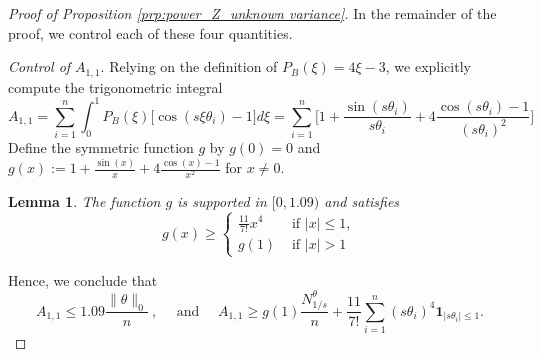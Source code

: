 \documentclass[twoside,11pt]{article}
\newtheorem{lem}{Lemma}
\def\beq{\begin{equation}}
\def\eeq{\end{equation}}
\newcommand{\<}{\langle}
\renewcommand{\>}{\rangle}
\begin{document}
\begin{proof}[Proof of Proposition \ref{prp:power_Z_unknown variance}]
 In the remainder of the proof, we control each of these four quantities. 
 
 \medskip 
 
 
 \noindent
 {\it Control of $A_{1,1}$}. Relying on the definition of $P_B(\xi)=4\xi-3$, we explicitly compute the trigonometric integral 
\[
A_{1,1} = \sum_{i=1}^n \int_{0}^1 P_B(\xi)\big[ \cos(s\xi\theta_i)-1 \big]d\xi= \sum_{i=1}^n  \Big[1 +  \frac{\sin(s \theta_i)}{s \theta_i}+ 4\frac{\cos(s \theta_i)-1}{(s\theta_i)^2} \Big]\]
Define the symmetric function $g$ by $g(0)=0$ and $g(x):= 1+ \frac{\sin(x)}{x}+ 4\frac{\cos(x)-1}{x^2}$ for $x\neq 0$.
\begin{lem}\label{lem:function_f}
The function $g$ is supported in $[0,1.09)$ and satisfies
\beq\label{eq:function_f_bound}
g(x) \geq \left\{
\begin{array}{cc}
 \frac{11}{7!} x^4 & \text{ if } |x|\leq 1,\\
 g(1) & \text{ if } |x|>1
\end{array}
\right.
\eeq 
\end{lem}
Hence, we conclude that 
\beq
A_{1,1}\leq1.09 \frac{\|\theta\|_0}{n} \ , \quad \text{ and }\quad 
A_{1,1}\geq  g(1) \frac{N_{1/s}^{\theta}}{n} + \frac{11}{7!}\sum_{i=1}^n (s\theta_i)^4 \mathbf{1}_{|s\theta_i|\leq 1}. \label{eq:upper_A11}
\eeq


\bigskip 


\end{proof}
\end{document}

